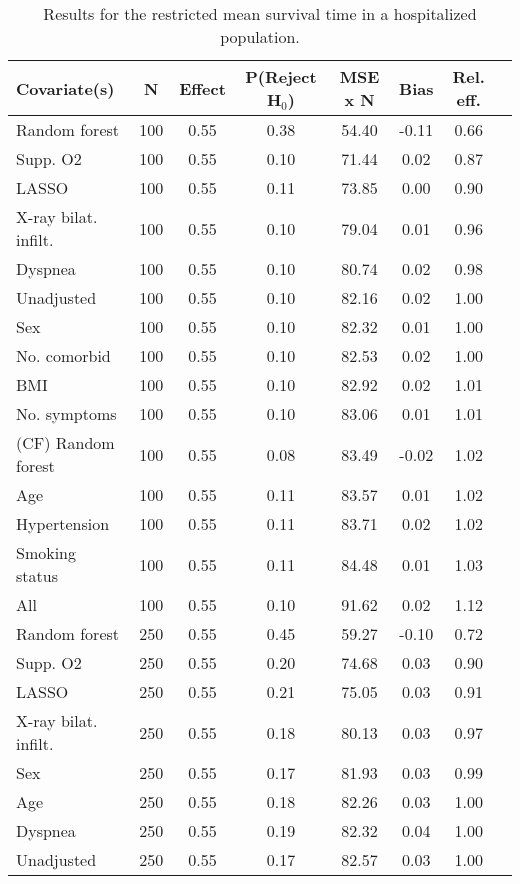 \documentclass{article}
\begin{document}
{\tabcolsep=6pt  %
\begin{longtable}{lccccccc}
\caption{Results for the restricted mean survival time in a hospitalized population.} \\
Covariate(s) & N & Effect & P(Reject H$_0$) & MSE x N & Bias & Rel. eff.\\ \midrule
Random forest & 100 & 0.55 & 0.38 & 54.40 & -0.11 & 0.66 \\ 
Supp. O2 & 100 & 0.55 & 0.10 & 71.44 &  0.02 & 0.87 \\ 
LASSO & 100 & 0.55 & 0.11 & 73.85 &  0.00 & 0.90 \\ 
X-ray bilat. infilt. & 100 & 0.55 & 0.10 & 79.04 &  0.01 & 0.96 \\ 
Dyspnea & 100 & 0.55 & 0.10 & 80.74 &  0.02 & 0.98 \\ 
Unadjusted & 100 & 0.55 & 0.10 & 82.16 &  0.02 & 1.00 \\ 
Sex & 100 & 0.55 & 0.10 & 82.32 &  0.01 & 1.00 \\ 
No. comorbid & 100 & 0.55 & 0.10 & 82.53 &  0.02 & 1.00 \\ 
BMI & 100 & 0.55 & 0.10 & 82.92 &  0.02 & 1.01 \\ 
No. symptoms & 100 & 0.55 & 0.10 & 83.06 &  0.01 & 1.01 \\ 
(CF) Random forest & 100 & 0.55 & 0.08 & 83.49 & -0.02 & 1.02 \\ 
Age & 100 & 0.55 & 0.11 & 83.57 &  0.01 & 1.02 \\ 
Hypertension & 100 & 0.55 & 0.11 & 83.71 &  0.02 & 1.02 \\ 
Smoking status & 100 & 0.55 & 0.11 & 84.48 &  0.01 & 1.03 \\ 
All & 100 & 0.55 & 0.10 & 91.62 &  0.02 & 1.12 \\ \midrule() 
Random forest & 250 & 0.55 & 0.45 & 59.27 & -0.10 & 0.72 \\ 
Supp. O2 & 250 & 0.55 & 0.20 & 74.68 &  0.03 & 0.90 \\ 
LASSO & 250 & 0.55 & 0.21 & 75.05 &  0.03 & 0.91 \\ 
X-ray bilat. infilt. & 250 & 0.55 & 0.18 & 80.13 &  0.03 & 0.97 \\ 
Sex & 250 & 0.55 & 0.17 & 81.93 &  0.03 & 0.99 \\ 
Age & 250 & 0.55 & 0.18 & 82.26 &  0.03 & 1.00 \\ 
Dyspnea & 250 & 0.55 & 0.19 & 82.32 &  0.04 & 1.00 \\ 
Unadjusted & 250 & 0.55 & 0.17 & 82.57 &  0.03 & 1.00 \\ 

\end{longtable}}
\end{document}
